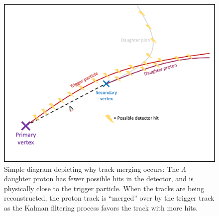 \documentclass[ALICE,manyauthors]{ALICE_analysis_notes}
\begin{document}
\begin{figure}[ht]
\centering
\includegraphics[width=5in]{figures/track_merging_diagram_withborder.pdf}
\caption{Simple diagram depicting why track merging occurs: The $\Lambda$ daughter proton has fewer possible hits in the detector, and is physically close to the trigger particle. When the tracks are being reconstructed, the proton track is ``merged'' over by the trigger track as the Kalman filtering process favors the track with more hits.}
\label{trackmerge_diagram}
\end{figure}
\end{document}
